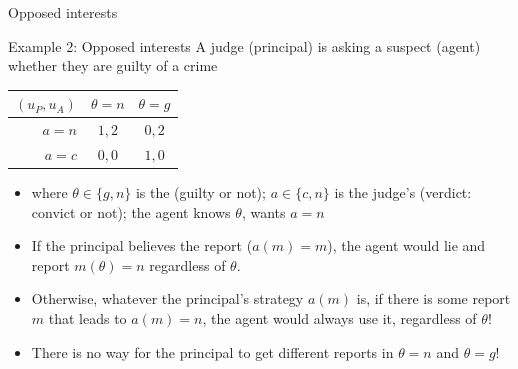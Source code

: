 \documentclass[english,10pt
,aspectratio=169
]{beamer}
\begin{document}
\begin{frame}{Opposed interests}
	\begin{exampleblock}{Example 2: Opposed interests}
		A judge (principal) is asking a suspect (agent) whether they are guilty of a crime
		\begin{center}
			\begin{tabular}{r | c | c |}
				$(u_P,u_A)$	& $\theta=n$	& $\theta=g$
				\\ \hline 
				$a=n$ 		& $1,2$			& $0,2$
				\\ \hline
				$a=c$		& $0,0$			& $1,0$
				\\ \hline 
			\end{tabular}
		\end{center}
	\end{exampleblock}
	
	\begin{itemize}
		\item where $\theta\in \{g,n\}$ is the  (guilty or not);
		$a \in \{c,n\}$ is the judge's  (verdict: convict or not);
		the agent knows $\theta$, wants $a=n$
		\pause \bigskip 
		\item If the principal believes the report ($a(m)=m$), the agent would lie and report $m(\theta) = n$ regardless of $\theta$.
		\pause 
		\item Otherwise, whatever the principal's strategy $a(m)$ is, if there is some report $m$ that leads to $a(m)=n$, the agent would always use it, regardless of $\theta$!
		\item There is no way for the principal to get different reports in $\theta=n$ and $\theta=g$!
	\end{itemize}
\end{frame}
\end{document}
